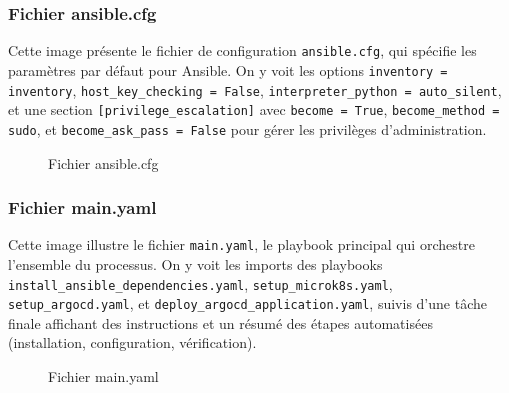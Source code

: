   \subsubsection{Fichier ansible.cfg}
  Cette image présente le fichier de configuration \texttt{ansible.cfg}, qui spécifie les paramètres par défaut pour Ansible. On y voit les options \texttt{inventory = inventory}, \texttt{host\_key\_checking = False}, \texttt{interpreter\_python = auto\_silent}, et une section \texttt{[privilege\_escalation]} avec \texttt{become = True}, \texttt{become\_method = sudo}, et \texttt{become\_ask\_pass = False} pour gérer les privilèges d’administration.
    \begin{figure}[h]
      \begin{adjustwidth}{-3.5cm}{-3.5cm}
      \centering
      \caption{Fichier ansible.cfg}
      \label{fig:ansible01}
      \end{adjustwidth}
  \end{figure}
  \subsubsection{Fichier main.yaml}
  Cette image illustre le fichier \texttt{main.yaml}, le playbook principal qui orchestre l’ensemble du processus. On y voit les imports des playbooks \texttt{install\_ansible\_dependencies.yaml}, \texttt{setup\_microk8s.yaml}, \texttt{setup\_argocd.yaml}, et \texttt{deploy\_argocd\_application.yaml}, suivis d’une tâche finale affichant des instructions et un résumé des étapes automatisées (installation, configuration, vérification).
  \newpage
  \begin{figure}[h]
    \vspace*{-2cm}
      \begin{adjustwidth}{-3.5cm}{-3.5cm}
      \centering
      \caption{Fichier main.yaml}
      \label{fig:ansible02}
      \end{adjustwidth}
  \end{figure}
